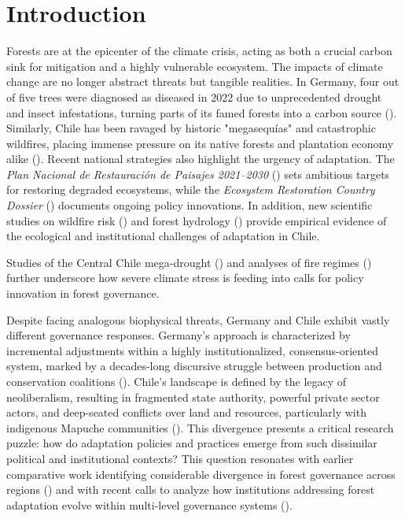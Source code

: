 \section*{Introduction}

Forests are at the epicenter of the climate crisis, acting as both a crucial 
carbon sink for mitigation and a highly vulnerable ecosystem. The impacts of 
climate change are no longer abstract threats but tangible realities. In Germany, 
four out of five trees were diagnosed as diseased in 2022 due to unprecedented 
drought and insect infestations, turning parts of its famed forests into a 
carbon source (\citealp{BMEL2023}). Similarly, Chile has been ravaged by historic 
"megasequías" and catastrophic wildfires, placing immense pressure on its native 
forests and plantation economy alike (\citealp{FAO2022}). Recent national strategies 
also highlight the urgency of adaptation. The \textit{Plan Nacional de Restauración de 
Paisajes 2021--2030} (\citealp{MMA2021}) sets ambitious targets for restoring degraded 
ecosystems, while the \textit{Ecosystem Restoration Country Dossier} 
(\citealp{MMACONAF2024}) documents ongoing policy innovations. In addition, new 
scientific studies on wildfire risk (\citealp{VidalSilva2025}) and forest hydrology 
(\citealp{Balocchi2023}) provide empirical evidence of the ecological and institutional 
challenges of adaptation in Chile.

Studies of the Central Chile mega-drought (\citealp{Garreaud2020MegaDrought}) and 
analyses of fire regimes (\citealp{McWethy2021FiresChile}) further underscore how 
severe climate stress is feeding into calls for policy innovation in forest governance.

Despite facing analogous biophysical threats, Germany and Chile exhibit vastly 
different governance responses. Germany's approach is characterized by incremental
 adjustments within a highly institutionalized, consensus-oriented system, marked 
 by a decades-long discursive struggle between production and conservation 
 coalitions (\citealp{Winkel2011}). Chile's landscape is defined by the legacy 
 of neoliberalism, resulting in fragmented state authority, powerful private 
 sector actors, and deep-seated conflicts over land and resources, particularly 
 with indigenous Mapuche communities (\citealp{Manuschevich2016}). This divergence 
 presents a critical research puzzle: how do adaptation policies and practices 
 emerge from such dissimilar political and institutional contexts? This question 
 resonates with earlier comparative work identifying considerable divergence in 
 forest governance across regions (\citealp{HowlettRayner2006}) and with recent 
 calls to analyze how institutions addressing forest adaptation evolve within 
 multi-level governance systems (\citealp{KleinschmitChiassonPulzl2023}).

